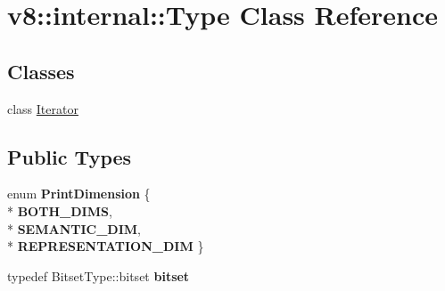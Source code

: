 \hypertarget{classv8_1_1internal_1_1_type}{}\section{v8\+:\+:internal\+:\+:Type Class Reference}
\label{classv8_1_1internal_1_1_type}
\subsection*{Classes}
\begin{DoxyCompactItemize}
\item 
class \hyperlink{classv8_1_1internal_1_1_type_1_1_iterator}{Iterator}
\end{DoxyCompactItemize}
\subsection*{Public Types}
\begin{DoxyCompactItemize}
\item 
enum {\bfseries Print\+Dimension} \{ \\*
{\bfseries B\+O\+T\+H\+\_\+\+D\+I\+MS}, 
\\*
{\bfseries S\+E\+M\+A\+N\+T\+I\+C\+\_\+\+D\+IM}, 
\\*
{\bfseries R\+E\+P\+R\+E\+S\+E\+N\+T\+A\+T\+I\+O\+N\+\_\+\+D\+IM}
 \}\hypertarget{classv8_1_1internal_1_1_type_a758d839ae149e2a5656473e4e98512dc}{}\label{classv8_1_1internal_1_1_type_a758d839ae149e2a5656473e4e98512dc}

\item 
typedef Bitset\+Type\+::bitset {\bfseries bitset}\hypertarget{classv8_1_1internal_1_1_type_a67794ecfde6fb9f720c0d6cde1d0d20b}{}\label{classv8_1_1internal_1_1_type_a67794ecfde6fb9f720c0d6cde1d0d20b}

\end{DoxyCompactItemize}
